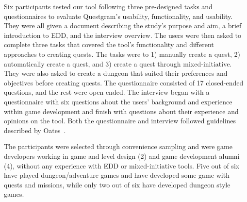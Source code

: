 

Six participants tested our tool following three pre-designed tasks and questionnaires to evaluate Questgram's usability, functionality, and usability. They were all given a document describing the study's purpose and aim, a brief introduction to EDD, and the interview overview. The users were then asked to complete three tasks that covered the tool's functionality and different approaches to creating quests. The tasks were to 1) manually create a quest, 2) automatically create a quest, and 3) create a quest through mixed-initiative. They were also asked to create a dungeon that suited their preferences and objectives before creating quests. The questionnaire consisted of 17 closed-ended questions, and the rest were open-ended. The interview began with a questionnaire with six questions about the users' background and experience within game development and finish with questions about their experience and opinions on the tool. Both the questionnaire and interview followed guidelines described by Oates~\cite{p833-ResearchingInfoSystems}.  

The participants were selected through convenience sampling and were game developers working in game and level design (2) and game development alumni (4), without any experience with EDD or mixed-initiative tools. Five out of six have played dungeon/adventure games and have developed some game with quests and missions, while only two out of six have developed dungeon style games.

